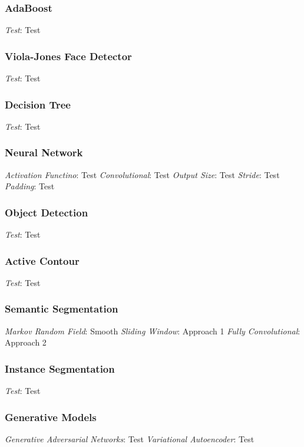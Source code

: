 \documentclass{article}
\begin{document}
\begin{multicols*}{2}
        \subsubsection*{AdaBoost}
        \textit{Test}: Test\newline
        \subsubsection*{Viola-Jones Face Detector}
        \textit{Test}: Test\newline
        \subsubsection*{Decision Tree}
        \textit{Test}: Test\newline
        \subsubsection*{Neural Network}
        \textit{Activation Functino}: Test\newline
        \textit{Convolutional}: Test\newline
        \textit{Output Size}: Test\newline
        \textit{Stride}: Test\newline
        \textit{Padding}: Test\newline
        \subsubsection*{Object Detection}
        \textit{Test}: Test\newline
        \subsubsection*{Active Contour}
        \textit{Test}: Test\newline
        \subsubsection*{Semantic Segmentation}
        \textit{Markov Random Field}: Smooth\newline
        \textit{Sliding Window}: Approach 1\newline
        \textit{Fully Convolutional}: Approach 2\newline
        \subsubsection*{Instance Segmentation}
        \textit{Test}: Test\newline
        \subsubsection*{Generative Models}
        \textit{Generative Adversarial Networks}: Test\newline
        \textit{Variational Autoencoder}: Test\newline
    \end{multicols*}
\end{document}
